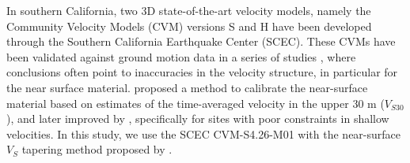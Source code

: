 In southern California, two 3D state-of-the-art velocity models, namely the Community Velocity Models (CVM) versions S and H have been developed through the Southern California Earthquake Center (SCEC). These CVMs have been validated against ground motion data in a series of studies , where conclusions often point to inaccuracies in the velocity structure, in particular for the near surface material. \citet{elyVs30derivedNearsurfaceSeismic2010} proposed a method to calibrate the near-surface material based on estimates of the time-averaged velocity in the upper 30 m ($V_{S30}$), and later improved by \citet{huCalibrationNearsurfaceSeismic2021}, specifically for sites with poor constraints in shallow velocities. In this study, we use the SCEC CVM-S4.26-M01 with the near-surface $V_S$ tapering method proposed by \citet{huCalibrationNearsurfaceSeismic2021}.

